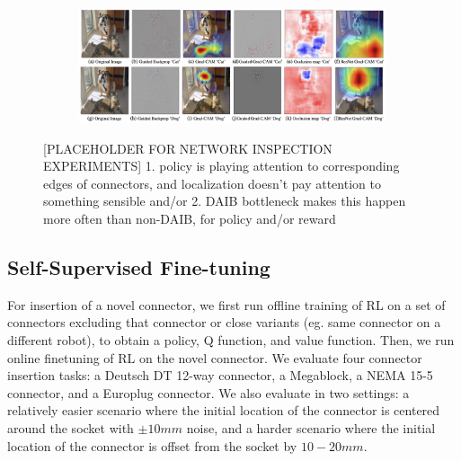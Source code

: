 \documentclass[letterpaper, 10 pt, conference, final]{ieeeconf}   %
\begin{document}

\begin{figure}[t]
    \centering
    \begin{subfigure}[b]{0.99\linewidth}
        \center
        \includegraphics[width=0.99\textwidth]{imgs/gradcam_placeholder.png}
    \end{subfigure}

    \caption{[PLACEHOLDER FOR NETWORK INSPECTION EXPERIMENTS] 1. policy is playing attention to corresponding edges of connectors, and localization doesn't pay attention to something sensible and/or 2. DAIB bottleneck makes this happen more often than non-DAIB, for policy and/or reward}

    \label{fig:novel_obj}
    \vspace{-0.5cm}
\end{figure}

\subsection{Self-Supervised Fine-tuning}

For insertion of a novel connector, we first run offline training of RL on a set of connectors excluding that connector or close variants (eg. same connector on a different robot), to obtain a policy, Q function, and value function.
Then, we run online finetuning of RL on the novel connector.
We evaluate four connector insertion tasks: a Deutsch DT 12-way connector, a Megablock, a NEMA 15-5 connector, and a Europlug connector.
We also evaluate in two settings: a relatively easier scenario where the initial location of the connector is centered around the socket with $\pm10mm$ noise, and a harder scenario where the initial location of the connector is offset from the socket by $10-20mm$.
\end{document}
